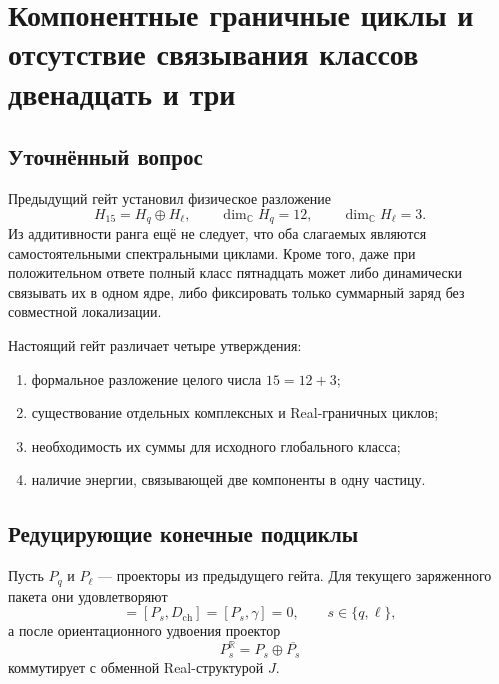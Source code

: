 \chapter{Компонентные граничные циклы и отсутствие связывания классов двенадцать и три}
\label{ch:v6-spectral-transition-component-boundary-gate}

\section{Уточнённый вопрос}

Предыдущий гейт установил физическое разложение
\begin{equation}
 H_{15}=H_q\oplus H_\ell,
 \qquad
 \dim_{\mathbb C}H_q=12,
 \qquad
 \dim_{\mathbb C}H_\ell=3.
 \label{eq:v6-component-boundary-split}
\end{equation}
Из аддитивности ранга ещё не следует, что оба слагаемых являются
самостоятельными спектральными циклами. Кроме того, даже при положительном
ответе полный класс пятнадцать может либо динамически связывать их в одном
ядре, либо фиксировать только суммарный заряд без совместной локализации.

Настоящий гейт различает четыре утверждения:
\begin{enumerate}
 \item формальное разложение целого числа $15=12+3$;
 \item существование отдельных комплексных и Real-граничных циклов;
 \item необходимость их суммы для исходного глобального класса;
 \item наличие энергии, связывающей две компоненты в одну частицу.
\end{enumerate}

\section{Редуцирующие конечные подциклы}

Пусть $P_q$ и $P_\ell$ --- проекторы из предыдущего гейта. Для текущего
заряженного пакета они удовлетворяют
\begin{equation}
 [P_s,a]=[P_s,D_{\mathrm{ch}}]=[P_s,\gamma]=0,
 \qquad s\in\{q,\ell\},
\end{equation}
а после ориентационного удвоения проектор
\begin{equation}
 P_s^{\mathbb R}=P_s\oplus\overline{P_s}
\end{equation}
коммутирует с обменной Real-структурой $J$.

